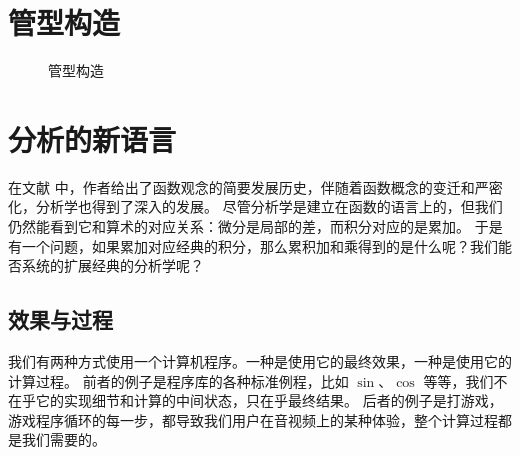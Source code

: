 \documentclass[a4paper,12pt]{article}
\numberwithin{definition}{section}
\numberwithin{lemma}{section}
\numberwithin{proposition}{section}
\numberwithin{theorem}{section}
\numberwithin{grammar}{section}
\numberwithin{program}{section}
\numberwithin{convention}{section}
\numberwithin{corollary}{section}
\begin{document}
\newpage

\section{管型构造}

\begin{figure}[ht]
    \centering
    \caption{管型构造}\label{fig:tube}
\end{figure}



\newpage

\section{分析的新语言}

在文献 \cite{Kleiner1989EvolutionOT} 中，作者给出了函数观念的简要发展历史，伴随着函数概念的变迁和严密化，分析学也得到了深入的发展。
尽管分析学是建立在函数的语言上的，但我们仍然能看到它和算术的对应关系：微分是局部的差，而积分对应的是累加。
于是有一个问题，如果累加对应经典的积分，那么累积加和乘得到的是什么呢？我们能否系统的扩展经典的分析学呢？

\subsection{效果与过程}

我们有两种方式使用一个计算机程序。一种是使用它的最终效果，一种是使用它的计算过程。
前者的例子是程序库的各种标准例程，比如 $\sin$、$\cos$ 等等，我们不在乎它的实现细节和计算的中间状态，只在乎最终结果。
后者的例子是打游戏，游戏程序循环的每一步，都导致我们用户在音视频上的某种体验，整个计算过程都是我们需要的。
\end{document}
